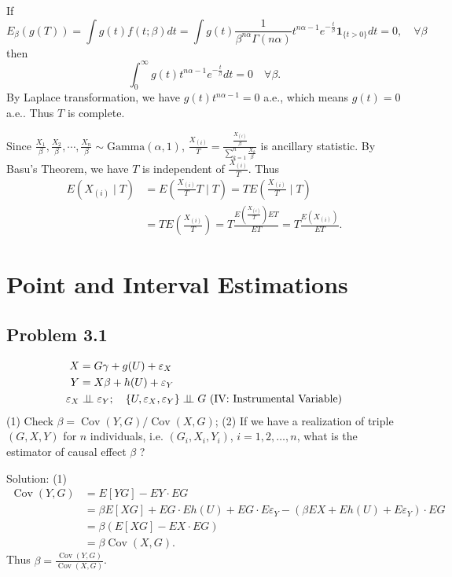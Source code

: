 If
\[
E_{\beta}(g(T))=\int g(t)f(t;\beta)dt=\int g(t)\frac{1}{\beta^{n\alpha}\Gamma(n\alpha)}t^{n\alpha-1}e^{-\frac{t}{\beta}}\mathbf{1}_{\{t>0\}}dt=0,\quad\forall\beta
\]
then
\[
\int_{0}^{\infty}g(t)t^{n\alpha-1}e^{-\frac{t}{\beta}}dt=0\quad\forall\beta.
\]
By Laplace transformation, we have $g(t)t^{n\alpha-1}=0$ a.e., which means $g(t)=0$ a.e.. Thus $T$ is complete.

Since $\frac{X_{1}}{\beta},\frac{X_{2}}{\beta},\cdots,\frac{X_{n}}{\beta}\sim\text{Gamma}(\alpha,1)$, $\frac{X_{(i)}}{T}=\frac{\frac{X_{(i)}}{\beta}}{\sum_{k=1}^{n}\frac{X_{k}}{\beta}}$ is ancillary statistic. By Basu's Theorem, we have $T$ is independent of $\frac{X_{(i)}}{T}$. Thus
\begin{align*}
E\left(X_{(i)}\mid T\right)&=E\left(\frac{X_{(i)}}{T}T\mid T\right)=TE\left(\frac{X_{(i)}}{T}\mid T\right)\\
&=TE\left(\frac{X_{(i)}}{T}\right)=T\frac{E\left(\frac{X_{(i)}}{T}\right)ET}{ET}=T\frac{E\left(X_{(i)}\right)}{ET}.
\end{align*}

\section{Point and Interval Estimations}

\subsection*{Problem 3.1}
\[
\begin{aligned}
X &= G\gamma + g(U)+\varepsilon_{X} \\
Y &= X\beta + h(U)+\varepsilon_{Y} \\
\varepsilon_{X} &\perp\!\!\!\perp \varepsilon_{Y}; \quad \{U,\varepsilon_{X},\varepsilon_{Y}\} \perp\!\!\!\perp G \text{ (IV: Instrumental Variable)}
\end{aligned}
\]
(1) Check $\beta=\operatorname{Cov}(Y,G)/\operatorname{Cov}(X,G)$;
(2) If we have a realization of triple $(G,X,Y)$ for $n$ individuals, i.e. $(G_i,X_i,Y_i)$, $i=1,2,\ldots,n$, what is the estimator of causal effect $\beta$ ?

{Solution:}
(1)
\[
\begin{aligned}
\operatorname{Cov}(Y,G) &= E[YG]-EY\cdot EG \\
&= \beta E[XG]+EG\cdot Eh(U)+EG\cdot E\varepsilon_{Y}-(\beta EX+Eh(U)+E\varepsilon_{Y})\cdot EG \\
&= \beta(E[XG]-EX\cdot EG) \\
&= \beta\operatorname{Cov}(X,G).
\end{aligned}
\]
Thus $\beta=\frac{\operatorname{Cov}(Y,G)}{\operatorname{Cov}(X,G)}$.

